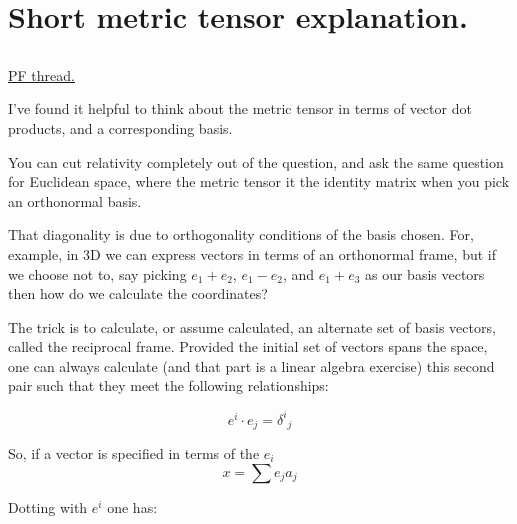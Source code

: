 
%


\chapter{Short metric tensor explanation.}

%


\section{}

\href{http://www.physicsforums.com/showthread.php?p=1853416}{PF thread.}

I've found it helpful to think about the metric tensor in terms of vector dot products, and a corresponding basis.  

You can cut relativity completely out of the question, and ask the same question for Euclidean space, where the metric tensor it the identity matrix when you pick an orthonormal basis.

That diagonality is due to orthogonality conditions of the basis chosen.  For, example, in 3D we can express vectors in terms of an
orthonormal frame, but if we choose not to, say picking $e_1 + e_2$, $e_1-e_2$, and $e_1 + e_3$ as our basis vectors then how do we calculate the coordinates?

The trick is to calculate, or assume calculated, an alternate set of basis vectors, called the reciprocal frame.  Provided the initial set of vectors spans the space, one can always calculate (and that part is a linear algebra exercise) this second pair such that they meet the following relationships:

\begin{equation*}
e^i \cdot e_j = {\delta^i}_j
\end{equation*}

So, if a vector is specified in terms of the $e_i$
\begin{equation*}
x = \sum e_j a_j
\end{equation*}

Dotting with $e^i$ one has:

